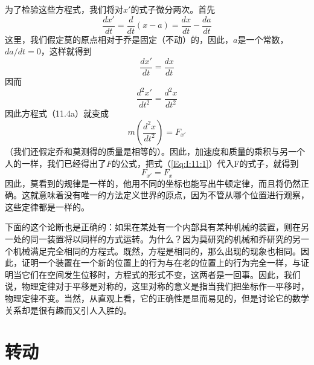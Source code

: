 为了检验这些方程式，我们将对$x'$的式子微分两次。首先
\begin{equation*}
    \frac{dx'}{dt}=\frac{d}{dt}(x-a)=\frac{dx}{dt}-\frac{da}{dt}
\end{equation*}
这里，我们假定莫的原点相对于乔是固定（不动）的，因此，$a$是一个常数，$da/dt=0$，这样就得到
\begin{equation*}
    \frac{dx'}{dt}=\frac{dx}{dt}
\end{equation*}
因而
\begin{equation*}
    \frac{d^2x'}{dt^2}=\frac{d^2x}{dt^2}
\end{equation*}
因此方程式（11.4a）就变成
\begin{equation*}
    m(\frac{d^2x}{dt^2})=F_{x'}
\end{equation*}
（我们还假定乔和莫测得的质量是相等的）。因此，加速度和质量的乘积与另一个人的一样，我们已经得出了$F$的公式，把式（\ref{Eq:I:11:1}）代入F的式子，就得到
\begin{equation*}
    F_{x'}=F_x
\end{equation*}
因此，莫看到的规律是一样的，他用不同的坐标也能写出牛顿定律，而且将仍然正确。这就意味着没有唯一的方法定义世界的原点，因为不管从哪个位置进行观察，这些定律都是一样的。

下面的这个论断也是正确的：如果在某处有一个内部具有某种机械的装置，则在另一处的同一装置将以同样的方式运转。为什么？因为莫研究的机械和乔研究的另一个机械满足完全相同的方程式。既然，方程是相同的，那么出现的现象也相同。因此，证明一个装置在一个新的位置上的行为与在老的位置上的行为完全一样，与证明当它们在空间发生位移时，方程式的形式不变，这两者是一回事。因此，我们说，物理定律对于平移是对称的，这里对称的意义是指当我们把坐标作一平移时，物理定律不变。当然，从直观上看，它的正确性是显而易见的，但是讨论它的数学关系却是很有趣而又引人入胜的。

\section{转动}

